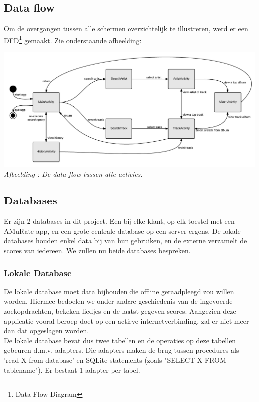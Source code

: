 \documentclass[11pt,a4paper]{article}
\newcounter{figc}
\newcommand{\figID} {%
   \stepcounter{figc}%
   \thefigc}
\begin{document}
	\subsection{Data flow}
	Om de overgangen tussen alle schermen overzichtelijk te illustreren, werd er een DFD\footnote{Data Flow Diagram} gemaakt. Zie onderstaande afbeelding: \newline
	
	\includegraphics[scale=1]{Pictures/Dataflow2.png} \newline
	\small \textit{Afbeelding \figID : De data flow tussen alle activies.} \\ \normalsize

	\subsection{Databases}
	Er zijn 2 databases in dit project. Een bij elke klant, op elk toestel met een AMuRate app, en een grote centrale database op een server ergens. De lokale databases houden enkel data bij van hun gebruiken, en de externe verzamelt de scores van iedereen. We zullen nu beide databases bespreken.
	
	\subsubsection{Lokale Database}
	De lokale database moet data bijhouden die offline geraadpleegd zou willen worden. Hiermee bedoelen we onder andere geschiedenis van de ingevoerde zoekopdrachten, bekeken liedjes en de laatst gegeven scores. Aangezien deze applicatie vooral beroep doet op een actieve internetverbinding, zal er niet meer dan dat opgeslagen worden. \\ \newline \newpage
	De lokale database bevat dus twee tabellen en de operaties op deze tabellen gebeuren d.m.v. adapters. Die adapters maken de brug tussen procedures als 'read-X-from-database' en SQLite statements (zoals "SELECT X FROM tablename"). Er bestaat 1 adapter per tabel. \newline
	 
\end{document}
